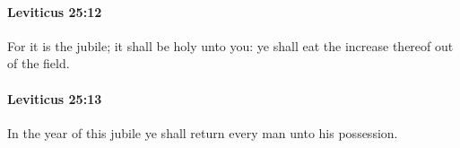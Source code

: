 		\paragraph{Leviticus 25:12} %
			\label{LEVITICUS-25-12}

			For it is the jubile; it shall be holy unto you: ye shall eat the increase thereof out of the field.


		\paragraph{Leviticus 25:13} %
			\label{LEVITICUS-25-13}

			In the year of this jubile ye shall return every man unto his possession.


